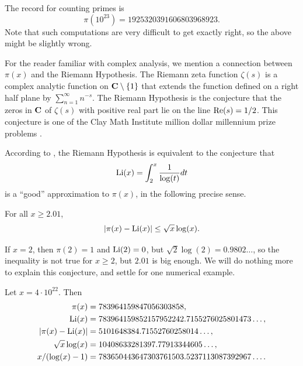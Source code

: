 The record for counting primes is
$$
  \pi(10^{23}) = 1925320391606803968923.
  $$
  Note that such computations are very difficult to get exactly right,
  so the above might be slightly wrong.

For the reader familiar with complex analysis, we mention a connection
between $\pi(x)$ and the Riemann Hypothesis.  The Riemann zeta
function $\zeta(s)$ is a complex analytic function on $\mathbf{C}\setminus
\{1\}$ that extends the function defined on a right half plane by
$\sum_{n=1}^{\infty} n^{-s}$.  The Riemann Hypothesis is the conjecture that the zeros in $\mathbf{C}$ of $\zeta(s)$
with positive real part lie on the line ${\rm Re}(s)=1/2$. This
conjecture is one of the Clay Math Institute million dollar millennium
prize problems \cite{cmi}.

  According to \cite[\S1.4.1]{primenumbers}, the Riemann Hypothesis is
  equivalent to the conjecture that
$$
  \operatorname{Li}(x) = \int_{2}^{x} \frac{1}{\log(t)} dt
$$
is a ``good'' approximation to $\pi(x)$, in the following
precise sense.
\begin{conjecture}
\mbox{}\newline{}For all  $x\geq 2.01$,
$$
 |\pi(x)-\operatorname{Li}(x)| \leq \sqrt{x}\log(x).
$$
\end{conjecture}
If $x=2$, then $\pi(2)=1$ and $\operatorname{Li}(2)=0$,
but $\sqrt{2}\log(2) = 0.9802\ldots$, so the inequality
is not true for $x\geq 2$, but $2.01$ is big enough.
We will do nothing more to explain this conjecture,
and settle for one numerical example.
\begin{example}
Let $x=4\cdot 10^{22}$.  Then
\begin{align*}
  \pi(x) &= 783964159847056303858,\\
  \operatorname{Li}(x) &= 783964159852157952242.7155276025801473\ldots, \\
  |\pi(x) - \operatorname{Li}(x)| &= 5101648384.71552760258014\ldots, \\
  \sqrt{x}\log(x) &=  10408633281397.77913344605\ldots, \\
  x/(\log(x)-1)  &=  783650443647303761503.5237113087392967\ldots.
\end{align*}
\end{example}


